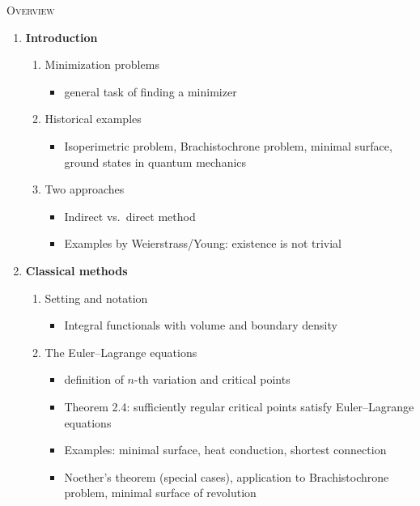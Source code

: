 \documentclass[12pt,a4paper]{article}
\begin{document}
\vspace{1.5em}
\begin{center}
\Large{\textsc{Overview}}\\
\end{center}

\renewcommand{\labelenumi}{\arabic{enumi}.} 
\renewcommand{\labelenumii}{\arabic{enumi}.\arabic{enumii}.}


\begin{enumerate}
    \item \textbf{Introduction}
    \begin{enumerate}
        \item Minimization problems
        \begin{itemize}
            \item general task of finding a minimizer
        \end{itemize}
        
        \item Historical examples
        \begin{itemize}
            \item Isoperimetric problem, Brachistochrone problem, minimal surface, ground states in quantum mechanics
        \end{itemize}
        
        \item Two approaches
        \begin{itemize}
            \item Indirect vs.\ direct method
            \item Examples by Weierstrass/Young: existence is not trivial
        \end{itemize}
    \end{enumerate}

    \item \textbf{Classical methods}
    \begin{enumerate}
        \item Setting and notation
        \begin{itemize}
            \item Integral functionals with volume and boundary density
        \end{itemize}
        \item The Euler--Lagrange equations
        \begin{itemize}
            \item definition of $n$-th variation and critical points
            \item Theorem 2.4: sufficiently regular critical points satisfy Euler--Lagrange equations
            \item Examples: minimal surface, heat conduction, shortest connection
            \item Noether's theorem (special cases), application to Brachistochrone problem, minimal surface of revolution
        \end{itemize}
        

\end{enumerate}
\end{enumerate}
\end{document}
